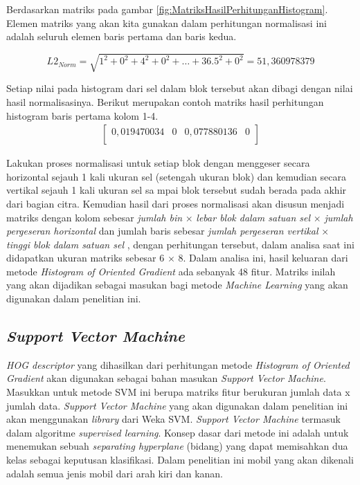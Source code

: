 Berdasarkan matriks pada gambar \ref{fig:MatriksHasilPerhitunganHistogram}. Elemen matriks yang akan kita gunakan dalam perhitungan normalisasi ini adalah seluruh elemen baris pertama dan baris kedua.

\begin{equation*}
L2_{Norm} = \sqrt{1^2 + 0^2 + 4^2 + 0^2 + \ldots + 36.5^2 + 0^2} = 51,360978379
\end{equation*}

Setiap nilai pada histogram dari sel dalam blok tersebut akan dibagi dengan nilai hasil normalisasinya. Berikut merupakan contoh matriks hasil perhitungan histogram baris pertama kolom 1-4.
\begin{gather*}
\begin{bmatrix}
0,019470034 & 0 & 0,077880136 & 0 \\
\end{bmatrix}
\end{gather*}

Lakukan proses normalisasi untuk setiap blok dengan menggeser secara horizontal sejauh 1 kali ukuran sel (setengah ukuran blok) dan kemudian secara vertikal sejauh 1 kali ukuran sel sa mpai blok tersebut sudah berada pada akhir dari bagian citra. Kemudian hasil dari proses normalisasi akan disusun menjadi matriks dengan kolom sebesar  \textit{jumlah bin} $\times$ \textit{lebar blok dalam satuan sel} $\times$ \textit{jumlah pergeseran horizontal} dan jumlah baris sebesar \textit{jumlah pergeseran vertikal} $\times$ \textit{tinggi blok dalam satuan sel} , dengan perhitungan tersebut, dalam analisa saat ini didapatkan ukuran matriks sebesar 6 $\times$ 8. Dalam analisa ini, hasil keluaran dari metode \textit{Histogram of Oriented Gradient} ada sebanyak 48 fitur. Matriks inilah yang akan dijadikan sebagai masukan bagi metode \textit{Machine Learning} yang akan digunakan dalam penelitian ini.\\

\subsection{\textit{Support Vector Machine}}
\textit{HOG descriptor} yang dihasilkan dari perhitungan metode \textit{Histogram of Oriented Gradient} akan digunakan sebagai bahan masukan \textit{Support Vector Machine}. Masukkan untuk metode SVM ini berupa matriks fitur berukuran jumlah data x jumlah data. \textit{Support Vector Machine} yang akan digunakan dalam penelitian ini akan menggunakan \textit{library} dari Weka SVM. \textit{Support Vector Machine} termasuk dalam algoritme \textit{supervised learning}. Konsep dasar dari metode ini adalah untuk menemukan sebuah \textit{separating hyperplane} (bidang) yang dapat memisahkan dua kelas sebagai keputusan klasifikasi. Dalam penelitian ini mobil yang akan dikenali adalah semua jenis mobil dari arah kiri dan kanan.

